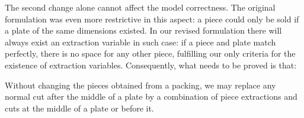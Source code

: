 \documentclass[smallextended]{svjour3}       %
\begin{document}
The second change alone cannot affect the model correctness.
The original formulation was even more restrictive in this aspect:
a piece could only be sold if a plate of the same dimensions existed.
In our revised formulation there will always exist an extraction variable in such case:
if a piece and plate match perfectly, there is no space for any other piece, fulfilling our only criteria for the existence of extraction variables.
Consequently, what needs to be proved is that:

\begin{theorem}
\label{the:enhanced_correctness}
Without changing the pieces obtained from a packing, we may replace any normal cut after the middle of a plate by a combination of piece extractions and cuts at the middle of a plate or before it.
\end{theorem}

\end{document}
